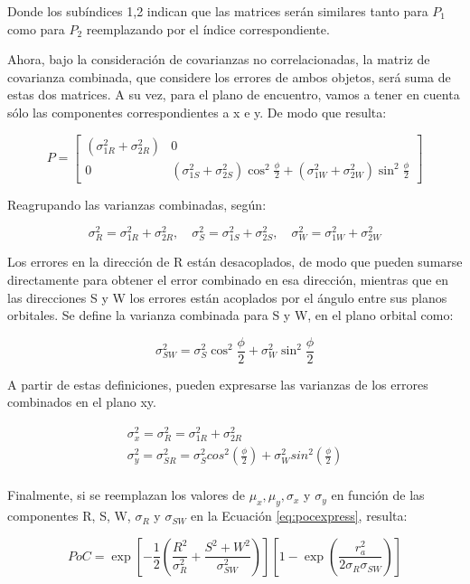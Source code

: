 Donde los sub\'indices 1,2 indican que las matrices ser\'an similares tanto para $P_{1}$ como para $P_{2}$ reemplazando por el \'indice correspondiente.

Ahora, bajo la consideraci\'on de covarianzas no correlacionadas, la matriz de covarianza combinada, que considere los errores de ambos objetos, ser\'a suma de estas dos matrices. A su vez, para el plano de encuentro, vamos a tener en cuenta s\'olo las componentes correspondientes a x e y. De modo que resulta:

$$
P=
\begin{bmatrix}
    (\sigma_{1R}^{2}+\sigma_{2R}^{2})& 0 \\
    0 & (\sigma_{1S}^{2}+\sigma_{2S}^{2}) \cos^{2}\frac{\phi}{2}+ (\sigma_{1W}^{2}+\sigma_{2W}^{2}) \sin^{2}\frac{\phi}{2}   
\end{bmatrix}
$$

Reagrupando las varianzas combinadas, seg\'un:

$$
\sigma_{R}^{2}=\sigma_{1R}^{2}+\sigma_{2R}^{2}, \quad \sigma_{S}^{2}=\sigma_{1S}^{2}+\sigma_{2S}^{2}, \quad \sigma_{W}^{2}=\sigma_{1W}^{2}+\sigma_{2W}^{2}
$$

Los errores en la direcci\'on de R est\'an desacoplados, de modo que pueden sumarse directamente para obtener el error combinado en esa direcci\'on, mientras que en las direcciones S y W los errores est\'an acoplados por el \'angulo entre sus planos orbitales. Se define la varianza combinada para S y W, en el plano orbital como:

$$
\sigma_{SW}^{2}=\sigma_{S}^{2} \cos^{2} \frac{\phi}{2}+\sigma_{W}^{2} \sin^{2} \frac{\phi}{2}
$$

A partir de estas definiciones, pueden expresarse las varianzas de los errores combinados en el plano xy.

\begin{gather*}
\sigma_{x}^{2}=\sigma_{R}^{2}=\sigma_{1R}^{2}+\sigma_{2R}^{2}\\
\sigma_{y}^{2}=\sigma_{SR}^{2}=\sigma_{S}^{2}cos^{2}(\frac{\phi}{2})+\sigma_{W}^{2}sin^{2}(\frac{\phi}{2})\\
\end{gather*}

Finalmente, si se reemplazan los valores de $\mu_{x}, \mu_{y}, \sigma_{x}$ y $\sigma_{y}$ en funci\'on de las componentes R, S, W, $\sigma_{R}$ y $\sigma_{SW}$ en la Ecuaci\'on {\ref{eq:pocexpress}}, resulta:

\begin{equation}
 PoC= \exp[-\frac{1}{2}(\frac{R^{2}}{\sigma_{R}^{2}}+\frac{S^{2}+W^{2}}{\sigma_{SW}^{2}})][1-\exp(\frac{r_{a}^{2}}{2\sigma_{R}\sigma_{SW}})]
 \label{eq:pocexpressRSW}
\end{equation}


